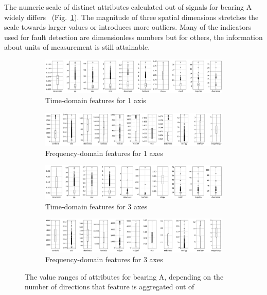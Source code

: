 The numeric scale of distinct attributes calculated out of signals for bearing A widely differs ~(Fig.~\ref{fig:design:feature-range}). The magnitude of three spatial dimensions stretches the scale towards larger values or introduces more outliers. Many of the indicators used for fault detection are dimensionless numbers but for others, the information about units of measurement is still attainable. 

\begin{figure}[h]
    \centering
    \begin{subfigure}[b]{0.48\textwidth}
        \includegraphics[width=\textwidth]{assets/results/feature-values/features-TD-dim1-A.png}
        \caption{Time-domain features for 1 axis}
    \end{subfigure}
    \hfill
    \begin{subfigure}[b]{0.48\textwidth}
        \includegraphics[width=\textwidth]{assets/results/feature-values/features-FD-dim1-A.png}
        \caption{Frequency-domain features for 1 axes}
    \end{subfigure}
    \begin{subfigure}[b]{0.48\textwidth}
        \includegraphics[width=\textwidth]{assets/results/feature-values/features-TD-dim3-A.png}
        \caption{Time-domain features for 3 axes}
    \end{subfigure}
    \hfill
    \begin{subfigure}[b]{0.48\textwidth}
        \includegraphics[width=\textwidth]{assets/results/feature-values/features-FD-dim3-A.png}
        \caption{Frequency-domain features for 3 axes}
    \end{subfigure}
    \caption{The value ranges of attributes for bearing A, depending on the number of directions that feature is aggregated out of}
    \label{fig:design:feature-range}
\end{figure}

